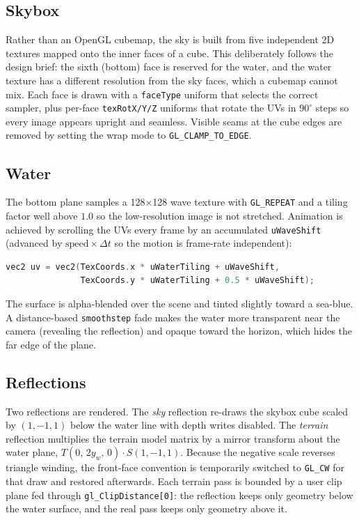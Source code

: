 \documentclass[11pt]{article}
\begin{document}
\subsection{Skybox}
Rather than an OpenGL cubemap, the sky is built from five independent 2D textures
mapped onto the inner faces of a cube. This deliberately follows the design brief: the
sixth (bottom) face is reserved for the water, and the water texture has a different
resolution from the sky faces, which a cubemap cannot mix. Each face is drawn with a
\texttt{faceType} uniform that selects the correct sampler, plus per-face
\texttt{texRotX/Y/Z} uniforms that rotate the UVs in $90^{\circ}$ steps so every image
appears upright and seamless. Visible seams at the cube edges are removed by setting
the wrap mode to \texttt{GL\_CLAMP\_TO\_EDGE}.

\subsection{Water}
The bottom plane samples a 128$\times$128 wave texture with \texttt{GL\_REPEAT} and a
tiling factor well above $1.0$ so the low-resolution image is not stretched. Animation
is achieved by scrolling the UVs every frame by an accumulated \texttt{uWaveShift}
(advanced by $\text{speed}\times\Delta t$ so the motion is frame-rate independent):
\begin{lstlisting}[language=C]
vec2 uv = vec2(TexCoords.x * uWaterTiling + uWaveShift,
               TexCoords.y * uWaterTiling + 0.5 * uWaveShift);
\end{lstlisting}
The surface is alpha-blended over the scene and tinted slightly toward a sea-blue. A
distance-based \texttt{smoothstep} fade makes the water more transparent near the
camera (revealing the reflection) and opaque toward the horizon, which hides the far
edge of the plane.

\subsection{Reflections}
Two reflections are rendered. The \emph{sky} reflection re-draws the skybox cube scaled
by $(1,-1,1)$ below the water line with depth writes disabled. The \emph{terrain}
reflection multiplies the terrain model matrix by a mirror transform about the water
plane, $T(0,\,2y_{w},\,0)\cdot S(1,-1,1)$. Because the negative scale reverses triangle
winding, the front-face convention is temporarily switched to \texttt{GL\_CW} for that
draw and restored afterwards. Each terrain pass is bounded by a user clip plane fed
through \texttt{gl\_ClipDistance[0]}: the reflection keeps only geometry below the water
surface, and the real pass keeps only geometry above it.
\end{document}
